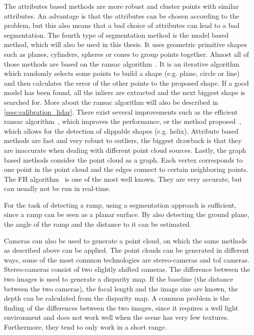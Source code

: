 The attributes based methods are more robust and cluster points with similar attributes.
An advantage is that the attributes can be chosen according to the problem, but this also means that a bad choice of attributes can lead to a bad segmentation.
The fourth type of segmentation method is the model based method, which will also be used in this thesis.
It uses geometric primitive shapes such as planes, cylinders, spheres or cones to group points together.
Almost all of those methods are based on the \gls{ransac} algorithm~\cite{Fischler1981}.
It is an iterative algorithm which randomly selects some points to build a shape (e.g. plane, circle or line) and then calculates the error of the other points to the proposed shape.
If a good model has been found, all the inliers are extracted and the next biggest shape is searched for.
More about the \gls{ransac} algorithm will also be described in \cref{ssec:calibration_lidar}.
There exist several improvements such as the efficient \gls{ransac} algorithm~\cite{Schnabel2007}, which improves the performance, or the method proposed~\cite{li2011}, which allows for the detection of slippable shapes (e.g. helix).
Attribute based methods are fast and very robust to outliers, the biggest drawback is that they are inaccurate when dealing with different point cloud sources.
Lastly, the graph based methods consider the point cloud as a graph.
Each vertex corresponds to one point in the point cloud and the edges connect to certain neighboring points.
The FH algorithm~\cite{Felzenszwalb2004} is one of the most well known.
They are very accurate, but can usually not be run in real-time.

For the task of detecting a ramp, using a segmentation approach is sufficient, since a ramp can be seen as a planar surface.
By also detecting the ground plane, the angle of the ramp and the distance to it can be estimated.

Cameras can also be used to generate a point cloud, on which the same methods as described above can be applied.
The point clouds can be generated in different ways, some of the most common technologies are stereo-cameras and \gls{tof} cameras.
Stereo-cameras consist of two slightly shifted cameras.
The difference between the two images is used to generate a disparity map.
If the baseline (the distance between the two cameras), the focal length and the image size are known, the depth can be calculated from the disparity map.
A common problem is the finding of the differences between the two images, since it requires a well light environment and does not work well when the scene has very few textures.
Furthermore, they tend to only work in a short range.

